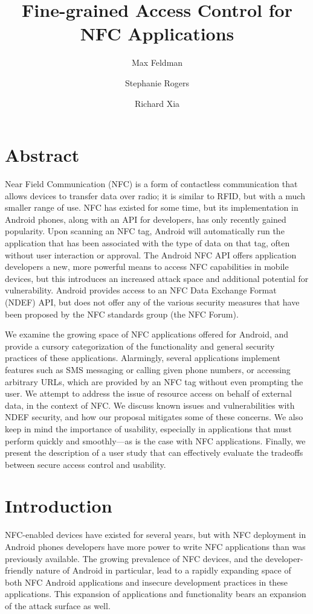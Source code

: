 \documentclass[12pt]{article}
\begin{document}
\title{Fine-grained Access Control for NFC Applications}
\author{Max Feldman \and Stephanie Rogers \and Richard Xia}
\maketitle

\section{Abstract}
Near Field Communication (NFC) is a form of contactless communication that allows devices to transfer data over radio; it is similar to RFID, but with a much smaller range of use.
NFC has existed for some time, but its implementation in Android phones, along with an API for developers, has only recently gained popularity.
Upon scanning an NFC tag, Android will automatically run the application that has been associated with the type of data on that tag, often without user interaction or approval.
The Android NFC API offers application developers a new, more powerful means to access NFC capabilities in mobile devices, but this introduces an increased attack space and additional potential for vulnerability.
Android provides access to an NFC Data Exchange Format (NDEF) API, but does not offer any of the various security measures that have been proposed by the NFC standards group (the NFC Forum).

We examine the growing space of NFC applications offered for Android, and provide a cursory categorization of the functionality and general security practices of these applications.
Alarmingly, several applications implement features such as SMS messaging or calling given phone numbers, or accessing arbitrary URLs, which are provided by an NFC tag without even prompting the user.
We attempt to address the issue of resource access on behalf of external data, in the context of NFC.
We discuss known issues and vulnerabilities with NDEF security, and how our proposal mitigates some of these concerns.
We also keep in mind the importance of usability, especially in applications that must perform quickly and smoothly---as is the case with NFC applications. Finally, we present the description of a user study that can effectively evaluate the tradeoffs between secure access control and usability.

\section{Introduction}
NFC-enabled devices have existed for several years, but with NFC deployment in Android phones developers have more power to write NFC applications than was previously available.
The growing prevalence of NFC devices, and the developer-friendly nature of Android in particular, lead to a rapidly expanding space of both NFC Android applications and insecure development practices in these applications.
This expansion of applications and functionality bears an expansion of the attack surface as well.
\end{document}
